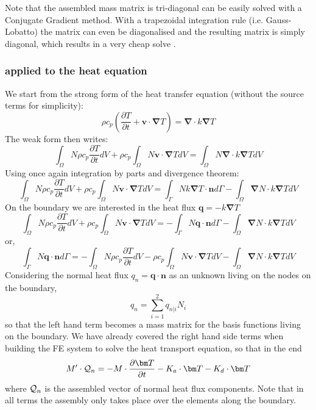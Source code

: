 Note that the assembled mass matrix is tri-diagonal can be easily solved with 
a Conjugate Gradient method. With a trapezoidal integration rule 
(i.e. Gauss-Lobatto) the matrix can even be diagonalised and the resulting 
matrix is simply diagonal, which results in a very cheap solve \cite{zhgh93}.

\subsubsection{applied to the heat equation}
We start from the strong form of the heat transfer equation (without the source terms for simplicity):
\[
\rho c_p
\left(\frac{\partial T}{\partial t} + {\bm v}\cdot {\bm \nabla}T\right)
=
{\bm \nabla} \cdot k{\bm \nabla T}
\]
The weak form then writes:
\[
\int_\Omega N
\rho c_p
\frac{\partial T}{\partial t} dV 
+
\rho c_p
\int_\Omega N
 {\bm v}\cdot {\bm \nabla}T  dV
=
\int_\Omega N
{\bm \nabla} \cdot k{\bm \nabla T} dV
\]
Using once again integration by parts and divergence theorem:
\[
\int_\Omega N
\rho c_p
\frac{\partial T}{\partial t} dV 
+
\rho c_p
\int_\Omega N
 {\bm v}\cdot {\bm \nabla}T  dV
=
\int_\Gamma N k {\bm \nabla T} \cdot {\bm n} d\Gamma
-
\int_\Omega  {\bm \nabla} N \cdot k{\bm \nabla T} dV
\]
On the boundary we are interested in the heat flux ${\bm q}=-k {\bm \nabla T}$
\[
\int_\Omega N
\rho c_p
\frac{\partial T}{\partial t} dV 
+
\rho c_p
\int_\Omega N
 {\bm v}\cdot {\bm \nabla}T  dV
=
-\int_\Gamma N {\bm q} \cdot {\bm n} d\Gamma
- \int_\Omega  {\bm \nabla} N \cdot k{\bm \nabla T} dV
\]
or,
\[
\int_\Gamma N {\bm q} \cdot {\bm n} d\Gamma
=
-\int_\Omega N
\rho c_p
\frac{\partial T}{\partial t} dV 
-\rho c_p
\int_\Omega N
 {\bm v}\cdot {\bm \nabla}T  dV
- \int_\Omega  {\bm \nabla} N \cdot k{\bm \nabla T} dV
\]
Considering the normal heat flux $q_n = {\bm q} \cdot {\bm n}$ as an unknown 
living on the nodes on the boundary, 
\[
q_n = \sum_{i=1}^2 q_{n|i} N_i
\]
so that the left hand term becomes a mass matrix for the basis functions living on 
the boundary.
We have already covered the right hand side terms when building the FE system 
to solve the heat transport equation, so that in the end 
\[
M' \cdot {\cal Q}_n =
- M \cdot \frac{\partial \bm T}{\partial t} -K_a \cdot {\bm T} - K_d \cdot {\bm T} 
\]
where ${\cal Q}_n$ is the assembled vector of normal heat flux components.
Note that in all terms the assembly only takes place over the elements along the boundary.







